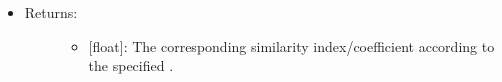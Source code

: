 \documentclass[letterpaper,10pt,english]{sphinxmanual}
\begin{document}
\begin{fulllineitems}
\begin{itemize}
\begin{description}
\end{description}

\item {} \begin{description}
\item[{Returns:}] \leavevmode\begin{itemize}
\item {} 
{[}float{]}: The corresponding similarity index/coefficient
according to the specified .

\end{itemize}

\end{description}

\end{itemize}

\end{fulllineitems}

\end{document}
